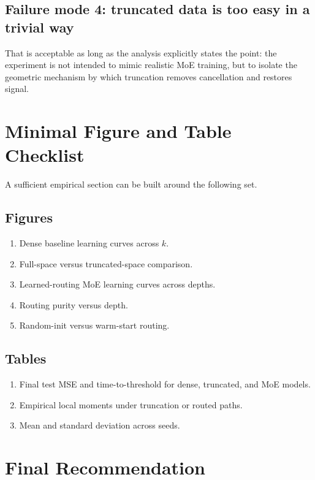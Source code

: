\documentclass[11pt]{article}
\begin{document}
\subsection{Failure mode 4: truncated data is too easy in a trivial way}

That is acceptable as long as the analysis explicitly states the point: the experiment is not intended to mimic realistic MoE training, but to isolate the geometric mechanism by which truncation removes cancellation and restores signal.

\section{Minimal Figure and Table Checklist}

A sufficient empirical section can be built around the following set.

\subsection{Figures}

\begin{enumerate}[leftmargin=2em]
    \item Dense baseline learning curves across $k$.
    \item Full-space versus truncated-space comparison.
    \item Learned-routing MoE learning curves across depths.
    \item Routing purity versus depth.
    \item Random-init versus warm-start routing.
\end{enumerate}

\subsection{Tables}

\begin{enumerate}[leftmargin=2em]
    \item Final test MSE and time-to-threshold for dense, truncated, and MoE models.
    \item Empirical local moments under truncation or routed paths.
    \item Mean and standard deviation across seeds.
\end{enumerate}

\section{Final Recommendation}
\end{document}
